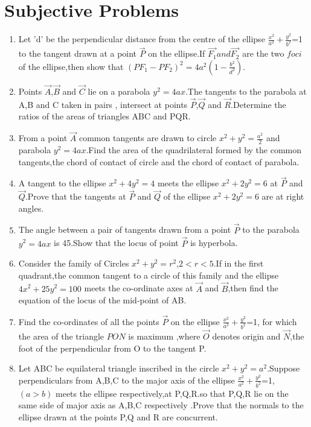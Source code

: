 \documentclass[journal,12pt,twocolumn]{IEEEtran}
\theoremstyle{remark}
\begin{document}
\section{Subjective Problems}
\begin{enumerate}
\item Let 'd' be the perpendicular distance from the centre of the ellipse $\frac{x^2}{a^2}+\frac{y^2}{b^2}$=1  to the tangent drawn at a point $\Vec{P}$ on the ellipse.If $\Vec{F_1} and  \Vec{F_2}$ are the two $foci$ of the ellipse,then show that $(P{F_1}-P{F_2})^2=4a^2(1-\frac{b^2}{d^2})$.
\hfill{}

\item Points $\Vec{A}$,$\Vec{B}$ and $\Vec{C}$ lie on a parabola $y^2=4ax$.The tangents to the parabola at A,B and C taken in pairs , intersect at points $\Vec{P}$,$\Vec{Q}$ and $\Vec{R}$.Determine the ratios of the areas of triangles ABC and PQR. \hfill{}
\item From a point $\Vec{A}$ common tangents  are drawn to circle $x^2+y^2=\frac{a^2}{2}$ and parabola $y^2=4ax$.Find the area of the quadrilateral formed by the common tangents,the chord of contact of circle and the chord of contact of parabola.
\hfill{}
\item A tangent to the ellipse $x^2+4y^2=4$ meets the ellipse $x^2+2y^2=6$ at $\Vec{P}$ and $\Vec{Q}$.Prove that the tangents at $\Vec{P}$ and $\Vec{Q}$ of the ellipse $x^2+2y^2=6$ are at right angles.
\hfill{}
\item The angle between a pair of tangents drawn from a point $\Vec{P}$ to the parabola $y^2=4ax$ is 45\degree .Show that the locus of point $\Vec{P}$ is hyperbola.
\hfill{}
\item Consider the family of Circles $x^2+y^2=r^2$,$2<r<5$.If in the first quadrant,the common tangent to a circle of this family and the ellipse $4x^2+25y^2=100$ meets the co-ordinate axes at $\Vec{A}$ and $\Vec{B}$,then find the equation of the locus of the mid-point  of AB.
\hfill{}
\item Find the co-ordinates of all the points $\Vec{P}$ on the ellipse $\frac{x^2}{a^2}+\frac{y^2}{b^2}$=1, for which the area of the triangle $PON$ is maximum ,where $\Vec{O}$ denotes origin  and $\Vec{N}$,the foot of the perpendicular from O to the tangent P.
\hfill{}
\item  Let ABC be equilateral triangle inscribed in the circle $x^2+y^2=a^2$.Suppose perpendiculars from A,B,C to the major axis of the ellipse $\frac{x^2}{a^2}+\frac{y^2}{b^2}$=1,$(a>b)$ meets the ellipse respectively,at P,Q,R.so that P,Q,R lie on the same side of major axis as A,B,C respectively .Prove that the normals to the ellipse drawn at the points P,Q and R are concurrent.

\end{enumerate}
\end{document}
